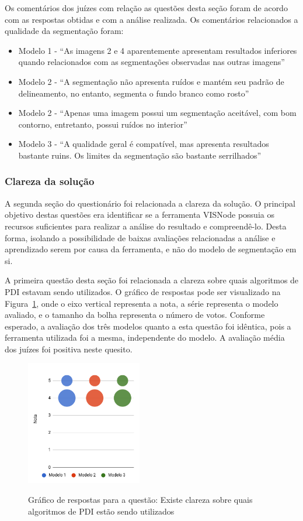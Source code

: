 \documentclass[12pt,oneside,a4paper,english,french,spanish,brazil,]{abntex2}
\begin{document}
Os comentários dos juízes com relação as questões desta seção foram de acordo com as respostas obtidas e com a análise realizada. Os comentários relacionados a qualidade da segmentação foram:
\begin{itemize}
    \item Modelo 1 - ``As imagens 2 e 4 aparentemente apresentam resultados inferiores quando relacionados com as segmentações observadas nas outras imagens''
    \item Modelo 2 - ``A segmentação não apresenta ruídos e mantém seu padrão de delineamento, no entanto, segmenta o fundo branco como rosto''
    \item Modelo 2 - ``Apenas uma imagem possui um segmentação aceitável, com bom contorno, entretanto, possui ruídos no interior''
    \item Modelo 3 - ``A qualidade geral é compatível, mas apresenta resultados bastante ruins. Os limites da segmentação são bastante serrilhados''
\end{itemize}

\subsubsection{Clareza da solução}

A segunda seção do questionário foi relacionada a clareza da solução. O principal objetivo destas questões era identificar se a ferramenta VISNode possuia os recursos suficientes para realizar a análise do resultado e compreendê-lo. Desta forma, isolando a possibilidade de baixas avaliações relacionadas a análise e aprendizado serem por causa da ferramenta, e não do modelo de segmentação em si.

A primeira questão desta seção foi relacionada a clareza sobre quais algoritmos de PDI estavam sendo utilizados. O gráfico de respostas pode ser visualizado na Figura~\ref{fig:AJ_Qualidade_8}, onde o eixo vertical representa a nota, a série representa o modelo avaliado, e o tamanho da bolha representa o número de votos. Conforme esperado, a avaliação dos três modelos quanto a esta questão foi idêntica, pois a ferramenta utilizada foi a mesma, independente do modelo. A avaliação média dos juízes foi positiva neste quesito.

\begin{figure}[ht]
\centering
\caption{Gráfico de respostas para a questão: Existe clareza sobre quais algoritmos de PDI estão sendo utilizados}
\includegraphics[width=0.45\textwidth]{imagens/Avaliacao_Juizes/Grafico_8.png}
\sourceAuthor{}
\label{fig:AJ_Qualidade_8}
\end{figure}
\end{document}

